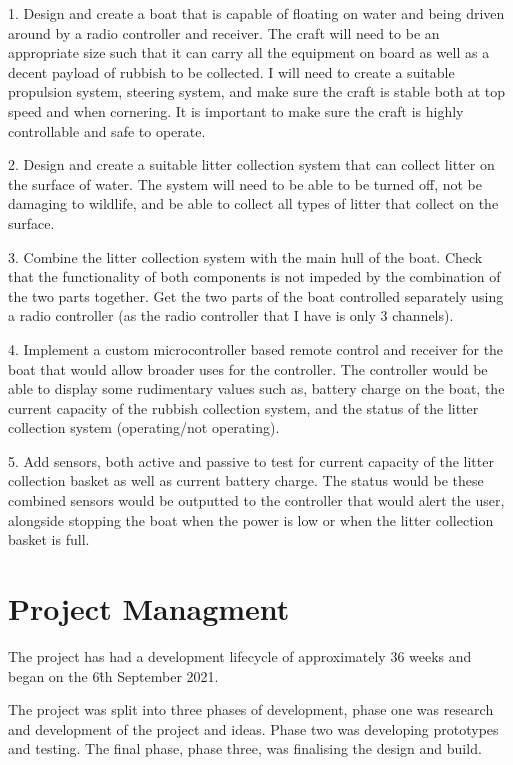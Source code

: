 \documentclass [11pt]{article}
\begin{document}
1.	Design and create a boat that is capable of floating on water and being driven around by a radio controller and receiver. The craft will need to be an appropriate size such that it can carry all the equipment on board as well as a decent payload of rubbish to be collected. I will need to create a suitable propulsion system, steering system, and make sure the craft is stable both at top speed and when cornering. It is important to make sure the craft is highly controllable and safe to operate. 

2.	Design and create a suitable litter collection system that can collect litter on the surface of water. The system will need to be able to be turned off, not be damaging to wildlife, and be able to collect all types of litter that collect on the surface. 

3.	Combine the litter collection system with the main hull of the boat. Check that the functionality of both components is not impeded by the combination of the two parts together. Get the two parts of the boat controlled separately using a radio controller (as the radio controller that I have is only 3 channels).

4.	Implement a custom microcontroller based remote control and receiver for the boat that would allow broader uses for the controller. The controller would be able to display some rudimentary values such as, battery charge on the boat, the current capacity of the rubbish collection system, and the status of the litter collection system (operating/not operating).

5.	Add sensors, both active and passive to test for current capacity of the litter collection basket as well as current battery charge. The status would be these combined sensors would be outputted to the controller that would alert the user, alongside stopping the boat when the power is low or when the litter collection basket is full.  

\section{Project Managment}

The project has had a development lifecycle of approximately 36 weeks and began on the 6\^th September 2021. 

The project was split into three phases of development, phase one was research and development of the project and ideas. Phase two was developing prototypes and testing. The final phase, phase three, was finalising the design and build. 
\end{document}
